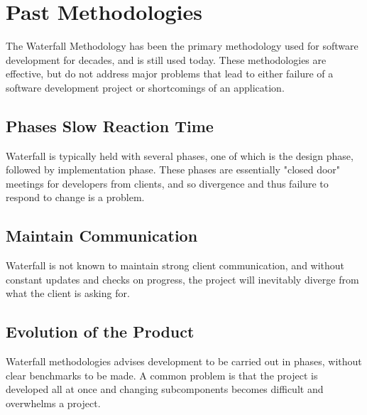 \documentclass[11pt]{article}
\begin{document}
\section{Past Methodologies}
The Waterfall Methodology has been the primary methodology used for software development for decades, and is still used today.
These methodologies are effective, but do not address major problems that lead to either failure of a software development
project or shortcomings of an application.

\subsection{Phases Slow Reaction Time}
Waterfall is typically held with several phases, one of which is the design phase, followed by implementation
phase. These phases are essentially "closed door" meetings for developers from clients, and so divergence and thus
failure to respond to change is a problem.

\subsection{Maintain Communication}
Waterfall is not known to maintain strong client communication, and without constant updates and checks on progress,
the project will inevitably diverge from what the client is asking for.

\subsection{Evolution of the Product}
Waterfall methodologies advises development to be carried out in phases, without clear benchmarks to be made. A common problem
is that the project is developed all at once and changing subcomponents becomes difficult and overwhelms a project.



\end{document}
